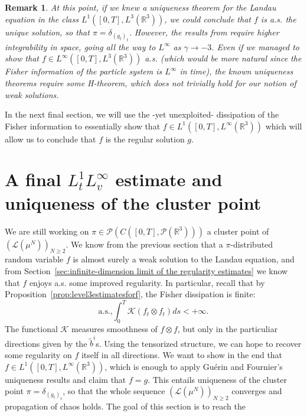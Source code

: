 \documentclass[11pt,a4paper]{article}
\theoremstyle{definition}
\theoremstyle{plain}
\newtheorem{remark}[defi]{Remark}
\begin{document}
\begin{remark}
    At this point, if we knew a uniqueness theorem for the Landau equation in the class $L^1([0,T],L^3(\mathbb{R}^3))$, we could conclude that $f$ is a.s. the unique solution, so that $\pi=\delta_{(g_t)_t}$. However, the results from \cite{GuerinFournier2008,Fournier2010} require higher integrability in space, going all the way to $L^\infty$ as $\gamma\rightarrow-3$.
    Even if we managed to show that $f\in L^\infty([0,T],L^3(\mathbb{R}^3))$ a.s. (which would be more natural since the Fisher information of the particle system is $L^\infty$ in time), the known uniqueness theorems \cite{AlonsoBaglandDesvillettes2024,ChernGualdani2022} require some H-theorem, which does not trivially hold for our notion of weak solutions.
\end{remark}
In the next final section, we will use the -yet unexploited- dissipation of the Fisher information to essentially show that $f\in L^1([0,T],L^\infty(\mathbb{R}^3))$ which will allow us to conclude that $f$ is the regular solution $g$.

\section{A final $L^1_t L^\infty_v$ estimate and uniqueness of the cluster point}
\label{sec:a final estimate}
We are still working on $\pi \in \mathcal{P}\left(C([0,T],\mathcal{P}(\mathbb{R}^3)) \right)$ a cluster point of $\left(\mathcal{L}\left( \mu^N\right) \right)_{N\geq 2 }$. We know from the previous section that a $\pi$-distributed random variable $f$ is almost surely a weak solution to the Landau equation, and from Section~\ref{sec:infinite-dimension limit of the regularity estimates} we know that $f$ enjoys a.s. some improved regularity. In particular, recall that by Proposition~\ref{prop:level3estimatesforf}, the Fisher dissipation is finite:
\begin{equation}
\label{eq:Kasfinite}
     \text{a.s.,}\int_0^T \mathcal{K}(f_t\otimes f_t)ds <+\infty.
\end{equation}
The functional $\mathcal{K}$ measures smoothness of $f\otimes f$, but only in the particuliar directions given by the $\tilde{b}^i$s. Using the tensorized structure, we can hope to recover some regularity on $f$ itself in all directions. We want to show in the end that $f\in L^1([0,T],L^\infty(\mathbb{R}^3))$, which is enough to apply Guérin and Fournier's uniqueness results \cite{GuerinFournier2008,Fournier2010} and claim that $f=g$. This entails uniqueness of the cluster point $\pi=\delta_{(g_t)_t}$, so that the whole sequence $\left(\mathcal{L}\left( \mu^N\right) \right)_{N\geq 2 }$ converges and propagation of chaos holds. The goal of this section is to reach the 
\end{document}
